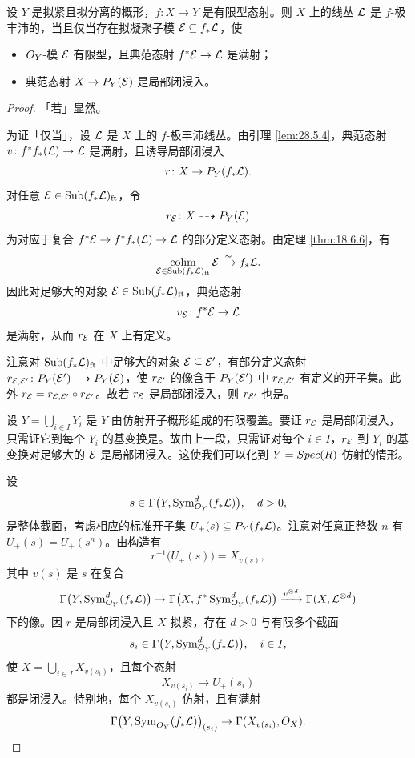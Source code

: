 \begin{proposition}\label{prop:28.5.6}
设 $Y$ 是拟紧且拟分离的概形，$f\colon X\to Y$ 是有限型态射。则 $X$ 上的线丛 $\mathcal{L}$ 是 $f$-极丰沛的，当且仅当存在拟凝聚子模 $\mathcal{E}\subseteq f_*\mathcal{L}$，使
\begin{itemize}[leftmargin=1.6em,itemsep=0.25ex]
  \item $O_Y$-模 $\mathcal{E}$ 有限型，且典范态射 $f^*\mathcal{E}\to\mathcal{L}$ 是满射；
  \item 典范态射 $X\to P_Y(\mathcal{E})$ 是局部闭浸入。
\end{itemize}
\end{proposition}

\begin{proof}
「若」显然。

为证「仅当」，设 $\mathcal{L}$ 是 $X$ 上的 $f$-极丰沛线丛。由引理 \ref{lem:28.5.4}，典范态射 $v\colon f^*f_*(\mathcal{L})\to\mathcal{L}$ 是满射，且诱导局部闭浸入
\[
r\colon X\to P_Y(f_*\mathcal{L}).
\]
对任意 $\mathcal{E}\in \operatorname{Sub}(f_*\mathcal{L})_{\mathrm{ft}}$，令
\[
r_{\mathcal{E}}\colon X\dashrightarrow P_Y(\mathcal{E})
\]
为对应于复合 $f^*\mathcal{E}\to f^*f_*(\mathcal{L})\to\mathcal{L}$ 的部分定义态射。由定理 \ref{thm:18.6.6}，有
\[
\operatorname*{colim}_{\mathcal{E}\in \operatorname{Sub}(f_*\mathcal{L})_{\mathrm{ft}}}\mathcal{E}\xrightarrow{\simeq}f_*\mathcal{L}.
\]
因此对足够大的对象 $\mathcal{E}\in \operatorname{Sub}(f_*\mathcal{L})_{\mathrm{ft}}$，典范态射
\[
v_{\mathcal{E}}\colon f^*\mathcal{E}\to\mathcal{L}
\]
是满射，从而 $r_{\mathcal{E}}$ 在 $X$ 上有定义。

注意对 $\operatorname{Sub}(f_*\mathcal{L})_{\mathrm{ft}}$ 中足够大的对象 $\mathcal{E}\subseteq\mathcal{E}'$，有部分定义态射 $r_{\mathcal{E},\mathcal{E}'}\colon P_Y(\mathcal{E}')\dashrightarrow P_Y(\mathcal{E})$，使 $r_{\mathcal{E}'}$ 的像含于 $P_Y(\mathcal{E}')$ 中 $r_{\mathcal{E},\mathcal{E}'}$ 有定义的开子集。此外 $r_{\mathcal{E}}=r_{\mathcal{E},\mathcal{E}'}\circ r_{\mathcal{E}'}$。故若 $r_{\mathcal{E}}$ 是局部闭浸入，则 $r_{\mathcal{E}'}$ 也是。

设 $Y=\bigcup_{i\in I}Y_i$ 是 $Y$ 由仿射开子概形组成的有限覆盖。要证 $r_{\mathcal{E}}$ 是局部闭浸入，只需证它到每个 $Y_i$ 的基变换是。故由上一段，只需证对每个 $i\in I$，$r_{\mathcal{E}}$ 到 $Y_i$ 的基变换对足够大的 $\mathcal{E}$ 是局部闭浸入。这使我们可以化到 $Y=Spec(R)$ 仿射的情形。

设
\[
s\in\Gamma\bigl(Y,\operatorname{Sym}^d_{O_Y}(f_*\mathcal{L})\bigr),\quad d>0,
\]
是整体截面，考虑相应的标准开子集 $U_+(s)\subseteq P_Y(f_*\mathcal{L})$。注意对任意正整数 $n$ 有 $U_+(s)=U_+(s^n)$。由构造有
\[
r^{-1}\bigl(U_+(s)\bigr)=X_{v(s)},
\]
其中 $v(s)$ 是 $s$ 在复合
\[
\Gamma\bigl(Y,\operatorname{Sym}^d_{O_Y}(f_*\mathcal{L})\bigr)\to\Gamma\bigl(X,f^*\operatorname{Sym}^d_{O_Y}(f_*\mathcal{L})\bigr)\xrightarrow{v^{\otimes d}}\Gamma(X,\mathcal{L}^{\otimes d})
\]
下的像。因 $r$ 是局部闭浸入且 $X$ 拟紧，存在 $d>0$ 与有限多个截面
\[
s_i\in\Gamma\bigl(Y,\operatorname{Sym}^d_{O_Y}(f_*\mathcal{L})\bigr),\quad i\in I,
\]
使 $X=\bigcup_{i\in I}X_{v(s_i)}$，且每个态射
\[
X_{v(s_i)}\to U_+(s_i)
\]
都是闭浸入。特别地，每个 $X_{v(s_i)}$ 仿射，且有满射
\[
\Gamma\bigl(Y,\operatorname{Sym}_{O_Y}(f_*\mathcal{L})\bigr)_{(s_i)}\to\Gamma(X_{v(s_i)},O_X).
\]


\end{proof}
